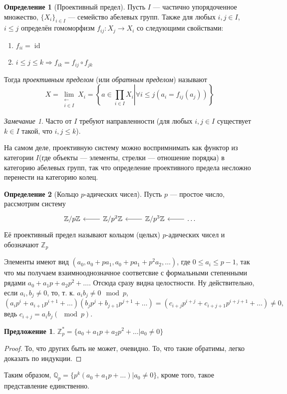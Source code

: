 \documentclass{article}
\newtheorem*{proposition}{Предложение}
\theoremstyle{definition}
\newtheorem*{definition}{Определение}
\theoremstyle{remark}
\newtheorem*{remark}{Замечание}
\DeclareMathOperator{\id}{id}
\newcommand{\Ra}{\Rightarrow}
\newcommand{\Z}{\mathbb{Z}}
\newcommand{\Q}{\mathbb{Q}}
\begin{document}
\begin{definition}[Проективный предел]
    Пусть $I$ --- частично упорядоченное множество, $\{X_i\}_{i \in I}$ --- семейство абелевых групп. Также для любых $i, j \in I$, $i \leq j$ определён гомоморфизм $f_{ij}: X_j \to X_i$ со следующими свойствами:
    \begin{enumerate}
	\item $f_{ii} = \id$
        \item $i \leq j \leq k \Ra f_{ik} = f_{ij} \circ f_{jk}$
    \end{enumerate}
    Тогда \textit{проективным пределом} (или \textit{обратным пределом}) называют
    \begin{equation*}
        X = \lim_{\substack{\leftarrow \\ i \in I}} X_i = \left\{ \left. a \in \prod_{i \in I} X_i \right| \forall i \leq j (a_i = f_{ij}(a_j)) \right\}
    \end{equation*}
\end{definition}

\begin{remark}
    Часто от $I$ требуют направленности (для любых $i, j \in I$ существует $k \in I$ такой, что $i, j \le k$). 
\end{remark}

На самом деле, проективную систему можно воспримнимать как функтор из категории $I$(где объекты --- элементы, стрелки --- отношение порядка) в категорию абелевых групп, так что определение проективного предела несложно перенести на категорию колец.

\begin{definition}[Кольцо $p$-адических чисел]
Пусть $p$ --- простое число, рассмотрим систему
\begin{equation*}
\begin{tikzcd}
	\Z / p\Z & \Z / p^2\Z \lar & \Z / p^3\Z \lar & \ldots \lar
\end{tikzcd}
\end{equation*}
Её проективный предел называют кольцом (целых) $p$-адических чисел и обозначают $\Z_p$
\end{definition}
Элементы имеют вид $(a_0, a_0 + pa_1, a_0 + pa_1 + p^2a_2, \ldots)$, где $0 \le a_i \le p - 1$, так что мы получаем взаимнооднозначное соответсвие с формальными степенными рядами $a_0 + a_1p + a_2p^2 + \ldots$. Отсюда сразу видна целостности. Ну действительно, если $a_i, b_j \neq 0$, то, т. к. $a_i b_j \neq 0 \mod p$,
$(a_ip^i + a_{i + 1}p^{i + 1} + \ldots)(b_j p^j + b_{j + 1} p^{j + 1} + \ldots) = (c_{i + j}p^{i + j} + c_{i + j + 1}p^{i + j + 1} + \ldots) \neq 0,$
ведь $c_{i + j} = a_i b_j (\mod p)$.
\begin{proposition}
	$\Z_p^* = \{a_0 + a_1p + a_2p^2 + \ldots| a_0 \neq 0\}$
\end{proposition}
\begin{proof}
То, что других быть не может, очевидно. То, что такие обратимы, легко доказать по индукции.
\end{proof}
Таким образом, $\Q_p = \{p^{k}(a_0 + a_1 p + \ldots) | a_0 \neq 0\}$, кроме того, такое представление единственно.
\end{document}
